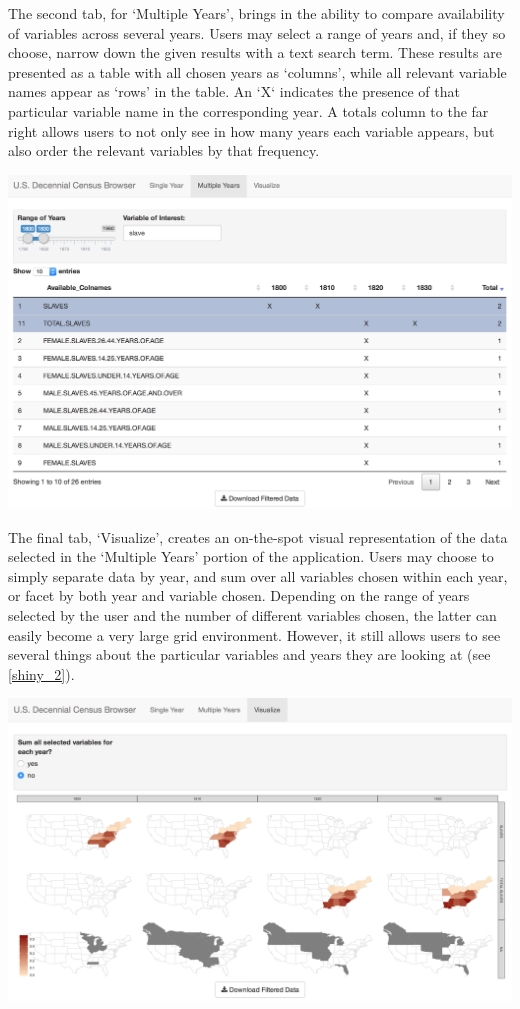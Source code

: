 \documentclass[DIV=calc, paper=a4, fontsize=10pt, twocolumn]{scrartcl}\usepackage[]{graphicx}\usepackage[]{color}
\begin{document}
\par The second tab, for `Multiple Years', brings in the ability to compare availability of variables across several years. Users may select a range of years and, if they so choose, narrow down the given results with a text search term. These results are presented as a table with all chosen years as `columns', while all relevant variable names appear as `rows' in the table. An `X` indicates the presence of that particular variable name in the corresponding year. A totals column to the far right allows users to not only see in how many years each variable appears, but also order the relevant variables by that frequency.  

\begin{center}
\includegraphics[width=.45\textwidth]{./figures/search_slaves_40years.png}  
\label{shiny_1}
\end{center}

\par The final tab, `Visualize', creates an on-the-spot visual representation of the data selected in the `Multiple Years' portion of the application. Users may choose to simply separate data by year, and sum over all variables chosen within each year, or facet by both year and variable chosen. Depending on the range of years selected by the user and the number of different variables chosen, the latter can easily become a very large grid environment. However, it still allows users to see several things about the particular variables and years they are looking at (see \autoref{shiny_2}).

\begin{center}
\includegraphics[width=.45\textwidth]{./figures/visualize_slaves_40years.png}  
\label{shiny_2}
\end{center}
\end{document}
